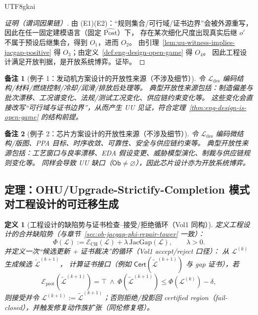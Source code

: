 \documentclass[12pt]{article}
\newtheorem{definition}{定义}[section]
\newtheorem{remark}{备注}[section]
\newcommand{\JacGap}{\ensuremath{\mathrm{JacGap}}} %
\begin{document}
\begin{CJK*}{UTF8}{gkai}
\begin{proof}[证明（谓词因果链）]
由 (E1)(E2)：“规则集合/可行域/证书边界”会被外源重写，因此在任一固定建模语言（固定 $\widehat{\mathrm{Post}}$）下，
存在某次细化尺度出现真实后继 $o'$ 不属于预设后继集合，得到 $O_1$，进而 $O_2$。
由引理~\ref{lem:uu-witness-implies-jacgap-positive} 得 $O_3$；由定义~\ref{def:eng-design-open-game} 得 $O_4$。
因此工程设计满足开放判据，是开放系统博弈。证毕。
\end{proof}

\begin{remark}[例子 1：发动机方案设计的开放性来源（不涉及细节）]
令 $\mathcal{L}_{\mathrm{des}}$ 编码结构/材料/燃烧控制/冷却/润滑/排放后处理等。
典型开放性来源包括：制造偏差与批次漂移、工况谱变化、法规/测试工况变化、供应链约束变化等。
这些变化会直接改写“可行域与证书边界”，从而产生 UU 见证，符合定理~\ref{thm:eng-design-is-open-game} 的结构前提。
\end{remark}

\begin{remark}[例子 2：芯片方案设计的开放性来源（不涉及细节）]
令 $\mathcal{L}_{\mathrm{des}}$ 编码微结构/版图、PPA 目标、时序收敛、可靠性、安全与供应链约束等。
典型开放性来源包括：工艺窗口与良率漂移、EDA 假设变更、威胁模型演化、制裁与供应链规则变化等。
同样会导致 UU 缺口（$\mathsf{Ob}\neq\varnothing$），因此芯片设计亦为开放系统博弈。
\end{remark}

\subsection{定理：OHU/Upgrade-Strictify-Completion 模式对工程设计的可迁移生成}
\label{sec:eng-design-ohutower}

\begin{definition}[工程设计的缺陷势与证书检查--接受/拒绝循环（Vol1 同构）]
\label{def:eng-design-phi-accept-reject}
定义工程设计的合并缺陷势（与章节~\ref{sec:ob-jacgap-phi-repair-tower} 一致）：
\[
  \Phi(\mathcal{L}):=\mathcal{E}_{\mathrm{CH}}(\mathcal{L})+\lambda\,\JacGap(\mathcal{L}),\qquad \lambda>0.
\]
并定义一次“候选更新 + 证书裁决”的循环（Vol1 accept/reject 口径）：
从 $\mathcal{L}^{(k)}$ 生成候选 $\widetilde{\mathcal{L}}^{(k+1)}$，
计算证书接口（例如 $\mathsf{Cert}(\widetilde{\mathcal{L}}^{(k+1)})$ 与 gap 证书），若
\[
  \mathcal{E}_{\mathrm{prot}}(\widetilde{\mathcal{L}}^{(k+1)})=\top
  \ \wedge\
  \Phi(\widetilde{\mathcal{L}}^{(k+1)})\le \Phi(\mathcal{L}^{(k)})-\delta,
\]
则接受并令 $\mathcal{L}^{(k+1)}:=\widetilde{\mathcal{L}}^{(k+1)}$；否则拒绝/投影回 certified region（fail-closed），并触发修复动作族扩张（同伦修复塔）。
\end{definition}


\end{CJK*}
\end{document}
